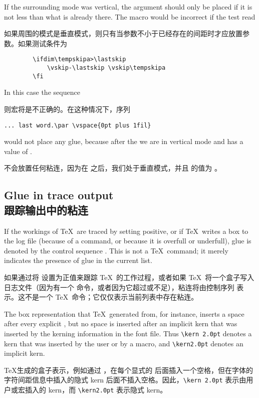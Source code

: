 If the surrounding mode was vertical, the argument
should only be placed if it is not less than what is
already there. The macro would be incorrect
if the test  read

如果周围的模式是垂直模式，则只有当参数不小于已经存在的间距时才应放置参数。如果测试条件为

\begin{verbatim}
        \ifdim\tempskipa>\lastskip 
            \vskip-\lastskip \vskip\tempskipa
        \fi
\end{verbatim}
In this case the sequence

则宏将是不正确的。在这种情况下，序列
\begin{verbatim}
... last word.\par \vspace{0pt plus 1fil}
\end{verbatim}
would not place any glue, because after
the  we are in vertical mode and
 has a value of \n{0pt}.

不会放置任何粘连，因为在  之后，我们处于垂直模式，并且  的值为 \n{0pt}。

\subsection{Glue in trace output\\跟踪输出中的粘连}

If the workings of \TeX\ are traced by setting
 positive, or if \TeX\ 
writes a box to the log file 
(because of a  command, or because it
is overfull or underfull),
glue  is denoted by the control sequence .
This is not a \TeX\ command; it merely indicates the presence
of glue in the current list.

如果通过将  设置为正值来跟踪 \TeX\ 的工作过程，或者如果 \TeX\ 将一个盒子写入日志文件（因为有一个  命令，或者因为它超过或不足），粘连将由控制序列  表示。这不是一个 \TeX\ 命令；它仅仅表示当前列表中存在粘连。

The box representation that \TeX\ generated from,
\alt
for instance, 
inserts a space after every explicit ,
but no space is inserted after an implicit
kern that was inserted by the kerning information in the font
 file. Thus \hbox{\verb-\kern 2.0pt-} denotes a kern
that was inserted by the user or by a macro, and
\verb-\kern2.0pt- denotes an implicit kern.

\TeX 生成的盒子表示，例如通过 ，在每个显式的  后面插入一个空格，但在字体的字符间距信息中插入的隐式 kern 后面不插入空格。因此，\hbox{\verb-\kern 2.0pt-} 表示由用户或宏插入的 kern，而 \verb-\kern2.0pt- 表示隐式 kern。

